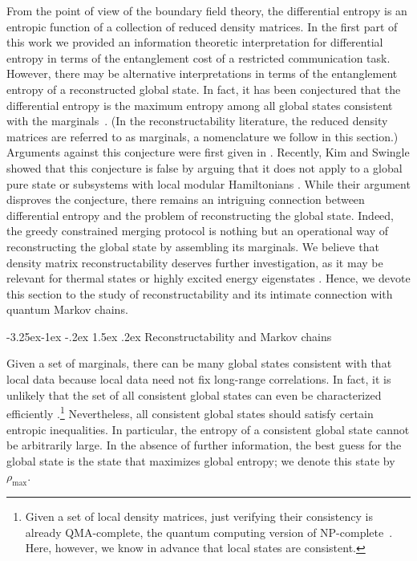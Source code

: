 \documentclass[12pt]{article}
\makeatletter
\renewcommand\subsection{\@startsection{subsection}{2}{\z@}%
                                     {-3.25ex\@plus -1ex \@minus -.2ex}%
                                     {1.5ex \@plus .2ex}%
                                     {\normalfont\bfseries}}
\makeatother
\begin{document}
From the point of view of the boundary field theory, the differential entropy is an entropic function of a collection of reduced density matrices. In the first part of this work we provided an information theoretic interpretation for differential entropy in terms of the entanglement cost of a restricted communication task. However, there may be alternative interpretations in terms of the entanglement entropy of a reconstructed global state. In fact, it has been conjectured that the differential entropy is the maximum entropy among all global states consistent with the marginals~\cite{holeography}. (In the reconstructability literature, the reduced density matrices are referred to as marginals, a nomenclature we follow in this section.) Arguments against this conjecture were first given in \cite{veronikajune}. Recently, Kim and Swingle showed that this conjecture is false by arguing that it does not apply to a global  pure state or subsystems with local modular Hamiltonians \cite{swingle-kim}. While their argument disproves the conjecture, there remains an intriguing connection between differential entropy and the problem of reconstructing the global state. Indeed, the greedy constrained merging protocol is nothing but an operational way of reconstructing the global state by assembling its marginals. We believe that density matrix reconstructability deserves further investigation, as it may be relevant for thermal states or highly excited energy eigenstates \cite{swingle-kim}. Hence, we devote this section to the study of reconstructability and its intimate connection with quantum Markov chains.

\subsection{Reconstructability and Markov chains}

Given a set of marginals, there can be many global states consistent with that local data because local data need not fix long-range correlations.
In fact, it is unlikely that the set of all consistent global states can even be characterized efficiently \cite{poulin2011markov}.\footnote{Given a set of local density matrices, just verifying their consistency is already QMA-complete, the quantum computing version of NP-complete~\cite{liu2006consistency}. Here, however, we know in advance that local states are consistent.
} Nevertheless, all consistent global states should satisfy certain entropic inequalities. In particular, the entropy of a consistent global state cannot be arbitrarily large. In the absence of further information, the best guess for the global state is the state that maximizes global entropy; we denote this state by $\rho_{\max}$.
\end{document}
